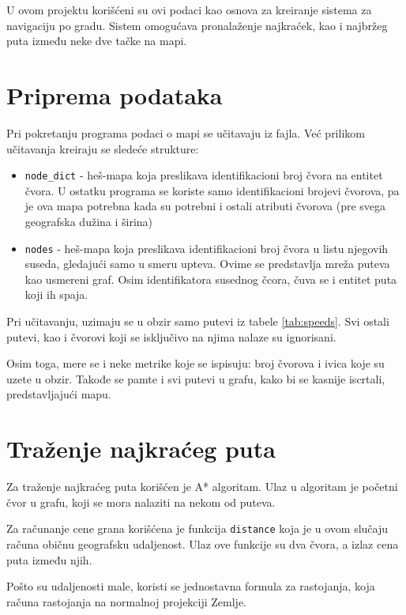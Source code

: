 \documentclass[a4paper]{article}
\begin{document}
U ovom projektu korišćeni su ovi podaci kao osnova za kreiranje sistema za navigaciju po gradu.
Sistem omogućava pronalaženje najkraćek, kao i najbržeg puta između neke dve tačke na mapi.

\newpage

\section{Priprema podataka}

Pri pokretanju programa podaci o mapi se učitavaju iz fajla. Već prilikom učitavanja kreiraju se sledeće strukture:

\begin{itemize}
    \item \lstinline{node_dict} - heš-mapa koja preslikava identifikacioni broj čvora na entitet čvora. U ostatku programa se koriste samo identifikacioni brojevi čvorova, pa je ova mapa potrebna kada su potrebni i ostali atributi čvorova (pre svega geografska dužina i širina)
    \item \lstinline{nodes} - heš-mapa koja preslikava identifikacioni broj čvora u listu njegovih suseda, gledajući samo u smeru upteva. Ovime se predstavlja mreža puteva kao usmereni graf. Osim identifikatora susednog čcora, čuva se i entitet puta koji ih spaja.
\end{itemize}

Pri učitavanju, uzimaju se u obzir samo putevi iz tabele \ref{tab:speeds}. Svi ostali putevi, kao i čvorovi koji se isključivo na njima nalaze su ignorisani.

Osim toga, mere se i neke metrike koje se ispisuju: broj čvorova i ivica koje su uzete u obzir. Takođe se pamte i svi putevi u grafu, kako bi se kasnije iscrtali, predstavljajući mapu.

\section{Traženje najkraćeg puta}

Za traženje najkraćeg puta korišćen je A* algoritam. Ulaz u algoritam je početni čvor u grafu, koji se mora nalaziti na nekom od puteva.

Za računanje cene grana korišćena je funkcija \lstinline{distance} koja je u ovom slučaju računa običnu geografsku udaljenost. Ulaz ove funkcije su dva čvora, a izlaz cena puta između njih.

Pošto su udaljenosti male, koristi se jednostavna formula za rastojanja, koja računa rastojanja na normalnoj projekciji Zemlje.
\end{document}
